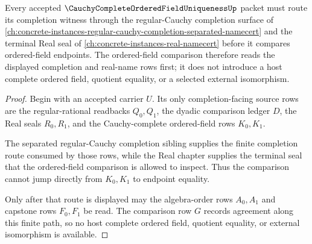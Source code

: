 \begin{theorem}
\label{thm:cauchy-complete-ordered-field-uniqueness-regular-cauchy-dependency}
Every accepted $\CauchyCompleteOrderedFieldUniquenessUp$ packet must route its completion witness through the regular-Cauchy completion surface of \autoref{ch:concrete-instances-regular-cauchy-completion-separated-namecert} and the terminal Real seal of \autoref{ch:concrete-instances-real-namecert} before it compares ordered-field endpoints. The ordered-field comparison therefore reads the displayed completion and real-name rows first; it does not introduce a host complete ordered field, quotient equality, or a selected external isomorphism.
\end{theorem}
\begin{proof}
Begin with an accepted carrier $U$. Its only completion-facing source rows are the regular-rational readbacks $Q_0,Q_1$, the dyadic comparison ledger $D$, the Real seals $R_0,R_1$, and the Cauchy-complete ordered-field rows $K_0,K_1$.

The separated regular-Cauchy completion sibling supplies the finite completion route consumed by those rows, while the Real chapter supplies the terminal seal that the ordered-field comparison is allowed to inspect. Thus the comparison cannot jump directly from $K_0,K_1$ to endpoint equality.

Only after that route is displayed may the algebra-order rows $A_0,A_1$ and capstone rows $F_0,F_1$ be read. The comparison row $G$ records agreement along this finite path, so no host complete ordered field, quotient equality, or external isomorphism is available.
\end{proof}



